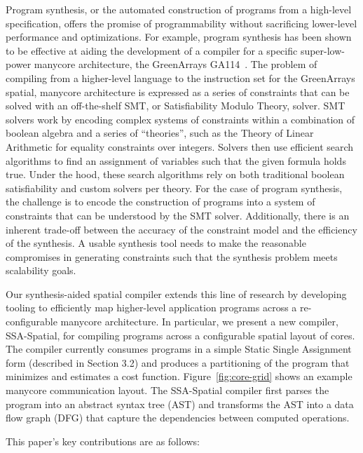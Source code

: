 \documentclass{sig-alternate-05-2015}
\begin{document}
Program synthesis, or the automated construction of programs from a high-level specification, offers the promise of programmability without sacrificing lower-level performance and optimizations. For example, program synthesis has been shown to be effective at aiding the development of a compiler for a specific super-low-power manycore architecture, the GreenArrays GA114~\cite{chlorophyll}. The problem of compiling from a higher-level language to the instruction set for the GreenArrays spatial, manycore architecture is expressed as a series of constraints that can be solved with an off-the-shelf SMT, or Satisfiability Modulo Theory, solver. SMT solvers work by encoding complex systems of constraints within a combination of boolean algebra and a series of ``theories'', such as the Theory of Linear Arithmetic for equality constraints over integers. Solvers then use efficient search algorithms to find an assignment of variables such that the given formula holds true. Under the hood, these search algorithms rely on both traditional boolean satisfiability and custom solvers per theory. For the case of program synthesis, the challenge is to encode the construction of programs into a system of constraints that can be understood by the SMT solver. Additionally, there is an inherent trade-off between the accuracy of the constraint model and the efficiency of the synthesis. A usable synthesis tool needs to make the reasonable compromises in generating constraints such that the synthesis problem meets scalability goals. 

Our synthesis-aided spatial compiler extends this line of research by developing tooling to efficiently map higher-level application programs across a re-configurable manycore architecture. In particular, we present a new compiler, SSA-Spatial, for compiling programs across a configurable spatial layout of cores. The compiler currently consumes programs in a simple Static Single Assignment form (described in Section 3.2) and produces a partitioning of the program that minimizes and estimates a cost function. Figure~\ref{fig:core-grid} shows an example manycore communication layout. The SSA-Spatial compiler first parses the program into an abstract syntax tree (AST) and transforms the AST into a data flow graph (DFG) that capture the dependencies between computed operations. 

This paper's key contributions are as follows:
\end{document}
